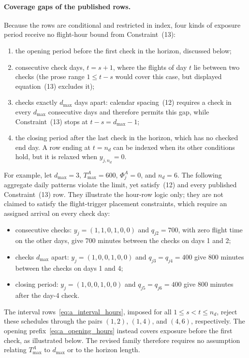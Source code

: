 \paragraph{Coverage gaps of the published rows.}
Because the rows are conditional and restricted in index, four kinds of
exposure period receive no flight-hour bound from Constraint~(13):
\begin{enumerate}
\item the opening period before the first check in the horizon, discussed
  below;
\item consecutive check days, $t=s+1$, where the flights of day $t$ lie
  between two checks (the prose range $1\le t-s$ would cover this case, but
  displayed equation~(13) excludes it);
\item checks exactly $d_{\max}$ days apart: calendar spacing~(12) requires a
  check in every $d_{\max}$ consecutive days and therefore permits this gap,
  while Constraint~(13) stops at $t-s=d_{\max}-1$;
\item the closing period after the last check in the horizon, which has no
  checked end day. A row ending at $t=n_d$ can be indexed when its other
  conditions hold, but it is relaxed when $y_{j,n_d}=0$.
\end{enumerate}
For example, let $d_{\max}=3$, $T^A_{\max}=600$, $\Phi^A_j=0$, and $n_d=6$.
The following aggregate daily patterns violate the limit, yet satisfy~(12)
and every published Constraint~(13) row. They illustrate the hour-row
logic only; they are not claimed to satisfy the flight-trigger placement
constraints, which require an assigned arrival on every check day:
\begin{itemize}
\item consecutive checks: $y_j=(1,1,0,1,0,0)$ and $q_{j2}=700$, with
  zero flight time on the other days, give 700 minutes between the checks on
  days 1 and 2;
\item checks $d_{\max}$ apart: $y_j=(1,0,0,1,0,0)$ and
  $q_{j3}=q_{j4}=400$ give 800 minutes between the checks on days 1 and 4;
\item closing period: $y_j=(1,0,0,1,0,0)$ and $q_{j5}=q_{j6}=400$ give
  800 minutes after the day-4 check.
\end{itemize}
The interval rows~\eqref{eq:a_interval_hours}, imposed for all
$1\le s<t\le n_d$, reject these schedules through the pairs $(1,2)$,
$(1,4)$, and $(4,6)$, respectively. The opening
prefix~\eqref{eq:a_opening_hours} instead covers exposure before the first
check, as illustrated below. The revised
family therefore requires no assumption relating $T^A_{\max}$ to
$d_{\max}$ or to the horizon length.

